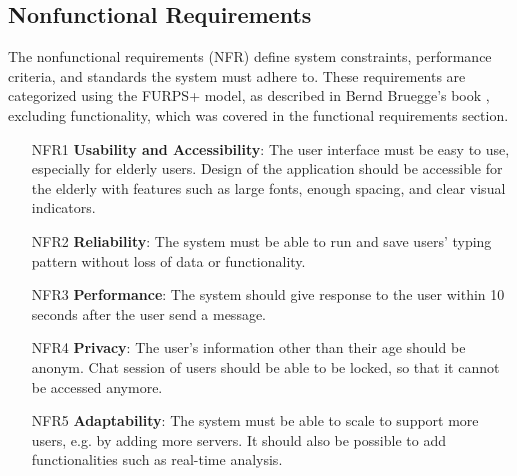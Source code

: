 \subsection{Nonfunctional Requirements}



The nonfunctional requirements (NFR) define system constraints, performance criteria, and standards the system must adhere to. 
These requirements are categorized using the FURPS+ model, as described in Bernd Bruegge's book \cite{bruegge2004object}, excluding functionality, which was covered in the functional requirements section.

\begin{itemize} 
    \item [NFR1] \textbf{Usability and Accessibility}: The user interface must be easy to use, especially for elderly users.
    Design of the application should be accessible for the elderly with features such as large fonts, enough spacing, and clear visual indicators. 
    \item [NFR2] \textbf{Reliability}: The system must be able to run and save users' typing pattern without loss of data or functionality. 
    \item [NFR3] \textbf{Performance}: The system should give response to the user within 10 seconds after the user send a message. 
    \item [NFR4] \textbf{Privacy}:
    The user's information other than their age should be anonym.
    Chat session of users should be able to be locked, so that it cannot be accessed anymore.
    \item [NFR5] \textbf{Adaptability}: The system must be able to scale to support more users, e.g. by adding more servers.
    It should also be possible to add functionalities such as real-time analysis. 
\end{itemize}

